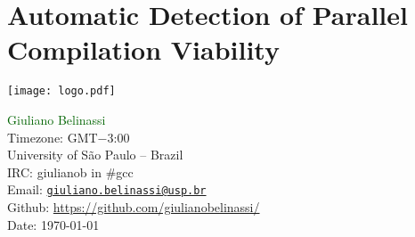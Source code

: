 


%
%
%
%
%
%
%
%
%
%

\chapter{Automatic Detection of Parallel Compilation Viability}\label{appendix2}
\vspace*{\fill}
{
     \centering
     \texttt{[image: logo.pdf]}
    \par
}
\vspace*{\fill}
\normalsize{
\noindent\textcolor{darkgreen}{Giuliano Belinassi} \\
Timezone: GMT$-$3:00 \\
University of São Paulo -- Brazil \\
IRC: giulianob in \#gcc \\
Email: \href{mailto:giuliano.belinassi@usp.br}{\texttt{giuliano.belinassi@usp.br}} \\
Github: \url{https://github.com/giulianobelinassi/} \\
Date: \today
}
\newpage

